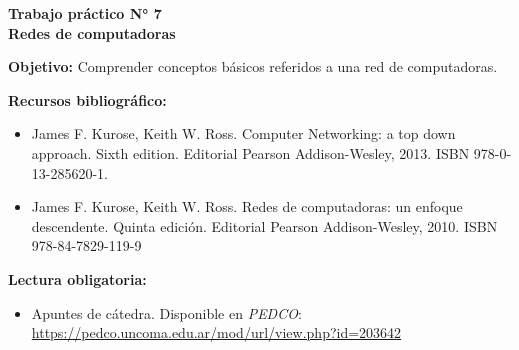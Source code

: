 \documentclass[12pt]{article}
\def\maketitle{

\makeatletter
{\color{bl} \centering \huge \sc \textbf{ Trabajo práctico N° 7\\ \large
\vspace*{-8pt} \color{black} Redes de computadoras \vspace*{8pt} }\par}
\makeatother

\makeatletter


}
\begin{document}
\thispagestyle{empty}
\maketitle
\setlength{\parindent}{1pt}

\textbf{Objetivo:} Comprender conceptos básicos referidos a una red de
computadoras.

\textbf{Recursos bibliográfico:}

\vspace{-2\topsep}
\begin{itemize}

    \itemsep2pt \parskip0pt 

    \item James F. Kurose, Keith W. Ross. Computer Networking: a top down
        approach. Sixth edition. Editorial Pearson Addison-Wesley, 2013.  ISBN
        978-0-13-285620-1.

    \item James F. Kurose, Keith W. Ross. Redes de computadoras: un enfoque
        descendente. Quinta edición. Editorial Pearson Addison-Wesley, 2010.
        ISBN 978-84-7829-119-9

\end{itemize}

\textbf{Lectura obligatoria:}

\vspace{-2\topsep}
\begin{itemize}

    \itemsep2pt \parskip0pt 

    \item Apuntes de cátedra. Disponible en \textit{PEDCO}:
        \url{https://pedco.uncoma.edu.ar/mod/url/view.php?id=203642}

\end{itemize}
\end{document}
